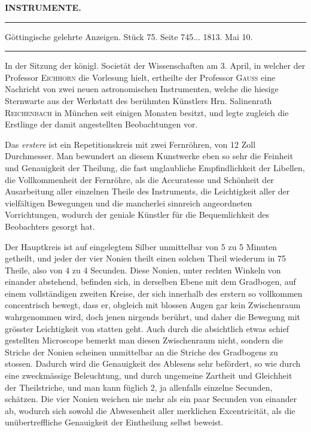 \clearpage{}\hypertarget{native-370-lower}{}\label{native-370-lower}
\begin{center}\textbf{INSTRUMENTE.}\par\vspace{4pt}\hrule\vspace{4pt}\fontsize{10}{12}\selectfont Göttingische gelehrte Anzeigen. Stück 75. Seite 745\;... 1813. Mai 10.\par\vspace{4pt}\hrule\vspace{4pt}\end{center}

\par\indent In der Sitzung der königl. Societät der Wissenschaften am 3. April, in welcher der Professor \textsc{Eichhorn} die Vorlesung hielt, ertheilte der Professor \textsc{Gauss} eine Nachricht von zwei neuen astronomischen Instrumenten, welche die hiesige Sternwarte aus der Werkstatt des berühmten Künstlers Hrn. Salinenrath \textsc{Reichenbach} in München seit einigen Monaten besitzt, und legte zugleich die Erstlinge der damit angestellten Beobachtungen vor.

\par\indent Das \emph{erstere} ist ein Repetitionskreis mit zwei Fernröhren, von 12 Zoll Durchmesser. Man bewundert an diesem Kunstwerke eben so sehr die Feinheit und Genauigkeit der Theilung, die fast unglaubliche Empfindlichkeit der Libellen, die Vollkommenheit der Fernröhre, als die Accuratesse und Schönheit der Ausarbeitung aller einzelnen Theile des Instruments, die Leichtigkeit aller der vielfältigen Bewegungen und die mancherlei sinnreich angeordneten Vorrichtungen, wodurch der geniale Künstler für die Bequemlichkeit des Beobachters gesorgt hat.

\par\indent Der Hauptkreis ist auf eingelegtem Silber unmittelbar von 5 zu 5 Minuten getheilt, und jeder der vier Nonien theilt einen solchen Theil wiederum in 75 Theile, also von 4 zu 4 Secunden. Diese Nonien, unter rechten Winkeln von einander abstehend, befinden sich, in derselben Ebene mit dem Gradbogen, auf einem vollständigen zweiten Kreise, der sich innerhalb des erstern so vollkommen concentrisch bewegt, dass er, obgleich mit blossen Augen gar kein Zwischenraum wahrgenommen wird, doch jenen nirgends berührt, und daher die Bewegung mit grösster Leichtigkeit von statten
geht. Auch durch die absichtlich etwas schief gestellten Microscope bemerkt man diesen
Zwischenraum nicht, sondern die Striche der Nonien scheinen unmittelbar an die Striche des
Gradbogens zu stossen. Dadurch wird die Genauigkeit des Ablesens sehr befördert, so wie
durch eine zweckmässige Beleuchtung, und durch ungemeine Zartheit und Gleichheit der
Theilstriche, und man kann füglich 2, ja allenfalls einzelne Secunden, schätzen. Die vier
Nonien weichen nie mehr als ein paar Secunden von einander ab, wodurch sich sowohl die
Abwesenheit aller merklichen Excentricität, als die unübertreffliche Genauigkeit der
Eintheilung selbst beweist.

